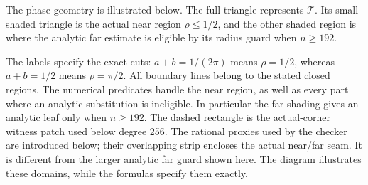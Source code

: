 The phase geometry is illustrated below. The full triangle represents
$\mathcal T$. Its small shaded triangle is the actual near region
$\rho\leq1/2$, and the other shaded region is where the analytic
far estimate is eligible by its radius guard when $n\geq192$.
\begin{center}
\end{center}
The labels specify the exact cuts: $a+b=1/(2\pi)$ means
$\rho=1/2$, whereas $a+b=1/2$ means $\rho=\pi/2$.
All boundary lines belong to the stated closed regions. The
numerical predicates handle the near region, as well as every part
where an analytic substitution is ineligible. In particular the far
shading gives an analytic leaf only when $n\geq192$. The dashed rectangle
is the actual-corner witness patch used below degree 256.
The rational proxies used by the checker are introduced below;
their overlapping strip encloses the actual near/far seam. It is
different from the larger analytic far guard shown here. The diagram
illustrates these domains, while the formulas specify them exactly.

